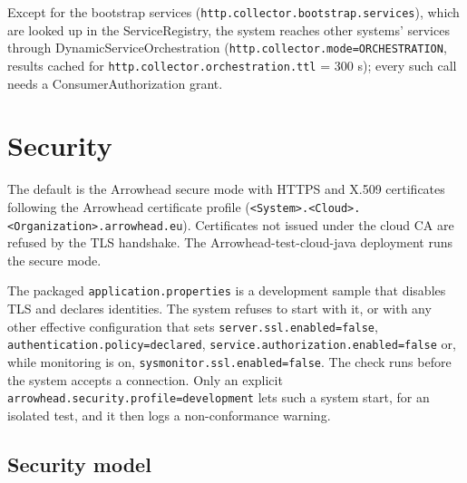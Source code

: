 \documentclass[a4paper]{arrowhead}
\begin{document}
Except for the bootstrap services (\texttt{http.collector.bootstrap.services}), which are looked up in the ServiceRegistry, the system reaches other systems' services through DynamicServiceOrchestration (\texttt{http.collector.mode=ORCHESTRATION}, results cached for \texttt{http.collector.orchestration.ttl} = 300 s); every such call needs a ConsumerAuthorization grant.

\newpage

\section{Security}
\label{sec:security}

The default is the Arrowhead secure mode with HTTPS and X.509 certificates following the Arrowhead certificate profile (\texttt{<System>.<Cloud>.<Organization>.arrowhead.eu}). Certificates not issued under the cloud CA are refused by the TLS handshake. The Arrowhead-test-cloud-java deployment runs the secure mode.

The packaged \texttt{application.properties} is a development sample that disables TLS and declares identities. The system refuses to start with it, or with any other effective configuration that sets \texttt{server.ssl.enabled=false}, \texttt{authentication.policy=declared}, \texttt{service.authorization.enabled=false} or, while monitoring is on, \texttt{sysmonitor.ssl.enabled=false}. The check runs before the system accepts a connection. Only an explicit \texttt{arrowhead.security.profile=development} lets such a system start, for an isolated test, and it then logs a non-conformance warning.

\subsection{Security model}
\end{document}
